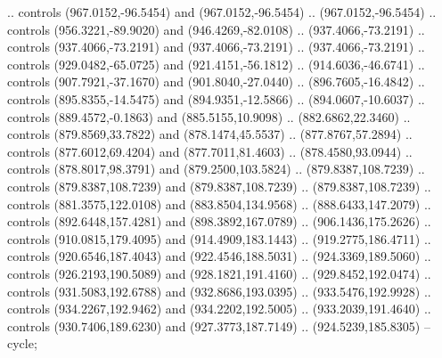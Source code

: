 \begin{scope}[shift={(-22.88722,-49.76189)}]
\begin{scope}[shift={(-739.46591,328.36782)}]
      .. controls (967.0152,-96.5454) and (967.0152,-96.5454) .. (967.0152,-96.5454)
      .. controls (956.3221,-89.9020) and (946.4269,-82.0108) .. (937.4066,-73.2191)
      .. controls (937.4066,-73.2191) and (937.4066,-73.2191) .. (937.4066,-73.2191)
      .. controls (929.0482,-65.0725) and (921.4151,-56.1812) .. (914.6036,-46.6741)
      .. controls (907.7921,-37.1670) and (901.8040,-27.0440) .. (896.7605,-16.4842)
      .. controls (895.8355,-14.5475) and (894.9351,-12.5866) .. (894.0607,-10.6037)
      .. controls (889.4572,-0.1863) and (885.5155,10.9098) .. (882.6862,22.3460) ..
      controls (879.8569,33.7822) and (878.1474,45.5537) .. (877.8767,57.2894) ..
      controls (877.6012,69.4204) and (877.7011,81.4603) .. (878.4580,93.0944) ..
      controls (878.8017,98.3791) and (879.2500,103.5824) .. (879.8387,108.7239) ..
      controls (879.8387,108.7239) and (879.8387,108.7239) .. (879.8387,108.7239) ..
      controls (881.3575,122.0108) and (883.8504,134.9568) .. (888.6433,147.2079) ..
      controls (892.6448,157.4281) and (898.3892,167.0789) .. (906.1436,175.2626) ..
      controls (910.0815,179.4095) and (914.4909,183.1443) .. (919.2775,186.4711) ..
      controls (920.6546,187.4043) and (922.4546,188.5031) .. (924.3369,189.5060) ..
      controls (926.2193,190.5089) and (928.1821,191.4160) .. (929.8452,192.0474) ..
      controls (931.5083,192.6788) and (932.8686,193.0395) .. (933.5476,192.9928) ..
      controls (934.2267,192.9462) and (934.2202,192.5005) .. (933.2039,191.4640) ..
      controls (930.7406,189.6230) and (927.3773,187.7149) .. (924.5239,185.8305) --
      cycle;


\end{scope}
\end{scope}
